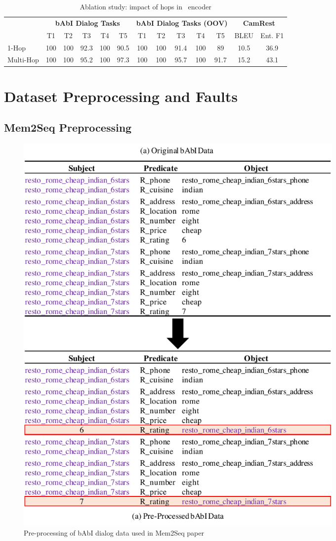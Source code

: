 \begin{table}[!ht]
\centering
\footnotesize
\begin{tabular}{l|ccccc|ccccc|cc}
\toprule
   & \multicolumn{5}{c|}{\textbf{bAbI Dialog Tasks}} & \multicolumn{5}{c|}{\textbf{bAbI Dialog Tasks (OOV)}}  & \multicolumn{2}{c}{\textbf{CamRest}} \\ \cmidrule{2-6} \cmidrule{7-11} \cmidrule{12-13}
    & T1  & T2  & T3   & T4   & T5   & T1 & T2 & T3 & T4 & T5 & BLEU        & Ent. F1       \\ \midrule
1-Hop  & 100 & 100 & 92.3 & 100 & 90.5 & 100 & 100 & 91.4 & 100 & 89 & 10.5 & 36.9 \\
Multi-Hop  & 100 & 100 & 95.2 & 100  & 97.3 & 100    & 100    & 95.7   & 100    & 91.7   & 15.2        & 43.1    
\\ \bottomrule
\end{tabular}
\caption{Ablation study: impact of hops in \sys\ encoder }
\label{tab:Aablationhop}
\end{table}

\clearpage

\section{Dataset Preprocessing and Faults}
\label{sec:preprocess}
\subsection{Mem2Seq Preprocessing}
\label{sec:prep_mem}

\begin{figure}[ht]
\centering
\includegraphics[width=0.8\textwidth]{assets/babi-preprocess.pdf}
\caption{Pre-processing of bAbI dialog data used in Mem2Seq paper}
\label{fig:prebabi}
\end{figure}

